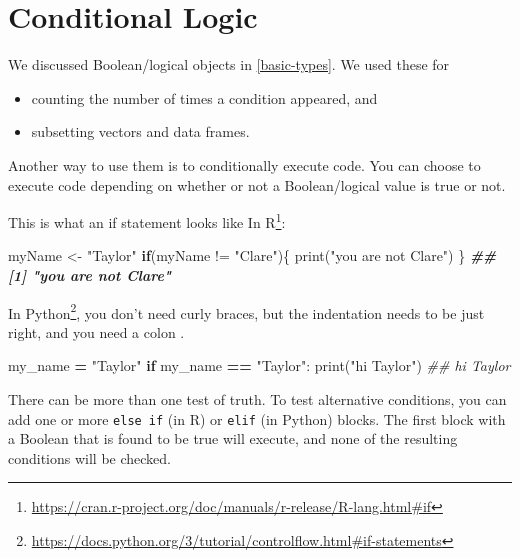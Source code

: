 \documentclass[
  12pt,
  krantz2]{krantz}
\makeatletter
\newenvironment{Shaded}{\begin{snugshade}}{\end{snugshade}}
\newcommand{\BuiltInTok}[1]{#1}
\newcommand{\CommentTok}[1]{\textcolor[rgb]{0.37,0.37,0.37}{\textit{#1}}}
\newcommand{\ControlFlowTok}[1]{\textcolor[rgb]{0.27,0.27,0.27}{\textbf{#1}}}
\newcommand{\DocumentationTok}[1]{\textcolor[rgb]{0.37,0.37,0.37}{\textbf{\textit{#1}}}}
\newcommand{\FunctionTok}[1]{\textcolor[rgb]{0,0,0}{#1}}
\newcommand{\NormalTok}[1]{#1}
\newcommand{\OperatorTok}[1]{\textcolor[rgb]{0.43,0.43,0.43}{\textbf{#1}}}
\newcommand{\OtherTok}[1]{\textcolor[rgb]{0.37,0.37,0.37}{#1}}
\newcommand{\SpecialCharTok}[1]{\textcolor[rgb]{0,0,0}{#1}}
\newcommand{\StringTok}[1]{\textcolor[rgb]{0.5,0.5,0.5}{#1}}
\providecommand{\tightlist}{%
  \setlength{\itemsep}{0pt}\setlength{\parskip}{0pt}}
\renewcommand{\href}[2]{#2\footnote{\url{#1}}}
\newenvironment{kframe}{%
\medskip{}
\setlength{\fboxsep}{.8em}
 \def\at@end@of@kframe{}%
 \ifinner\ifhmode%
  \def\at@end@of@kframe{\end{minipage}}%
  \begin{minipage}{\columnwidth}%
 \fi\fi%
 \def\FrameCommand##1{\hskip\@totalleftmargin \hskip-\fboxsep
 \colorbox{shadecolor}{##1}\hskip-\fboxsep
     \hskip-\linewidth \hskip-\@totalleftmargin \hskip\columnwidth}%
 \MakeFramed {\advance\hsize-\width
   \@totalleftmargin\z@ \linewidth\hsize
   \@setminipage}}%
 {\par\unskip\endMakeFramed%
 \at@end@of@kframe}
\renewenvironment{Shaded}{\begin{kframe}}{\end{kframe}}
\makeatother
\begin{document}
\hypertarget{conditional-logic}{%
\section{Conditional Logic}\label{conditional-logic}}

We discussed Boolean/logical objects in \ref{basic-types}. We used these for

\begin{itemize}
\tightlist
\item
  counting the number of times a condition appeared, and
\item
  subsetting vectors and data frames.
\end{itemize}

Another way to use them is to conditionally execute code. You can choose to execute code depending on whether or not a Boolean/logical value is true or not.

This is what an \href{https://cran.r-project.org/doc/manuals/r-release/R-lang.html\#if}{if statement looks like In R}:

\begin{Shaded}
\begin{Highlighting}[]
\NormalTok{myName }\OtherTok{\textless{}{-}} \StringTok{"Taylor"}
\ControlFlowTok{if}\NormalTok{(myName }\SpecialCharTok{!=} \StringTok{"Clare"}\NormalTok{)\{}
  \FunctionTok{print}\NormalTok{(}\StringTok{"you are not Clare"}\NormalTok{)}
\NormalTok{\}}
\DocumentationTok{\#\# [1] "you are not Clare"}
\end{Highlighting}
\end{Shaded}

\href{https://docs.python.org/3/tutorial/controlflow.html\#if-statements}{In Python}, you don't need curly braces, but the indentation needs to be just right, and you need a colon \citep{Lutz13}.

\begin{Shaded}
\begin{Highlighting}[]
\NormalTok{my\_name }\OperatorTok{=} \StringTok{"Taylor"}
\ControlFlowTok{if}\NormalTok{ my\_name }\OperatorTok{==} \StringTok{"Taylor"}\NormalTok{:}
    \BuiltInTok{print}\NormalTok{(}\StringTok{"hi Taylor"}\NormalTok{)}
\CommentTok{\#\# hi Taylor}
\end{Highlighting}
\end{Shaded}

There can be more than one test of truth. To test alternative conditions, you can add one or more \texttt{else\ if} (in R) or \texttt{elif} (in Python) blocks. The first block with a Boolean that is found to be true will execute, and none of the resulting conditions will be checked.
\end{document}
